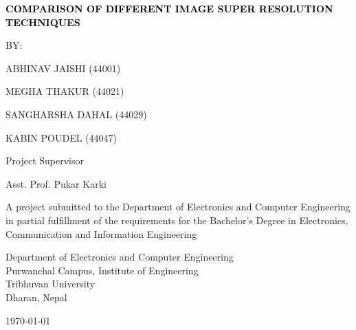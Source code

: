 \newpage
\thispagestyle{empty}
\begin{titlepage}
    \centering
{\fontsize{12pt}{14pt}\bfseries\textcolor{black}{COMPARISON OF DIFFERENT IMAGE SUPER RESOLUTION TECHNIQUES}\par}
\vspace{2.0cm}
       {BY:}
            \par ABHINAV JAISHI \hspace{1in} (44001)
            \par MEGHA THAKUR    \hspace{1in} (44021)
            \par SANGHARSHA DAHAL \hspace{0.6in} (44029)
            \par KABIN POUDEL     \hspace{1in}\space\space\space\space (44047)
       \vspace{2.0cm}\par
    Project Supervisor\par
    Asst. Prof. Pukar Karki\par
    \vspace{2.0cm}
    {A project submitted to the Department of Electronics and Computer Engineering in partial fulfillment of the requirements for the Bachelor’s Degree in Electronics, Communication and Information Engineering}\par
        \vspace{2.0cm}\par

    {Department of Electronics and Computer Engineering\\ Purwanchal Campus, Institute of Engineering \\ Tribhuvan University\\ Dharan, Nepal}\par
        \vspace{2.0cm}\par
        
        \today
\end{titlepage}